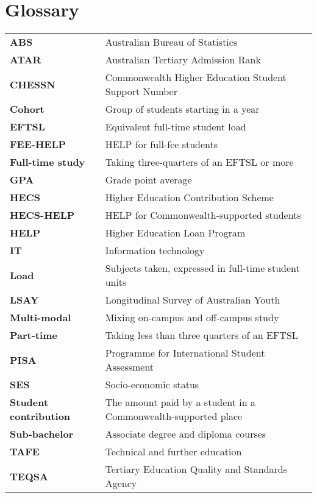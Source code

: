 \onecolumn
\chapter{Glossary}\label{chap:glossary}
\bgroup
\begin{table}[h!]
\def\arraystretch{1.4}
    \centering
    \label{tbl:glossary}
    \begin{tabularx}{\textwidth}{ ll }
    \textbf{ABS}        & Australian Bureau of Statistics \\
    \textbf{ATAR}       & Australian Tertiary Admission Rank \\
    \textbf{CHESSN}     & Commonwealth Higher Education Student Support Number \\
    \textbf{Cohort}     & Group of students starting in a year \\
    \textbf{EFTSL}      & Equivalent full-time student load \\
    \textbf{FEE-HELP}   & HELP for full-fee students \\
    \textbf{Full-time study} & Taking three-quarters of an EFTSL or more  \\
    \textbf{GPA}        & Grade point average \\
    \textbf{HECS}       & Higher Education Contribution Scheme \\
    \textbf{HECS-HELP}  & HELP for Commonwealth-supported students \\
    \textbf{HELP}       & Higher Education Loan Program \\
    \textbf{IT}         & Information technology \\
    \textbf{Load}       & Subjects taken, expressed in full-time student units \\
    \textbf{LSAY}       & Longitudinal Survey of Australian Youth \\
    \textbf{Multi-modal}& Mixing on-campus and off-campus study \\
    \textbf{Part-time}  & Taking less than three quarters of an EFTSL \\
    \textbf{PISA}       & Programme for International Student Assessment \\
    \textbf{SES}        & Socio-economic status \\
    \textbf{Student contribution}  & The amount paid by a student in a Commonwealth-supported place \\
    \textbf{Sub-bachelor} & Associate degree and diploma courses \\
    \textbf{TAFE}       & Technical and further education \\
    \textbf{TEQSA}      & Tertiary Education Quality and Standards Agency \\
    \end{tabularx}
\end{table}

\egroup

\twocolumn

